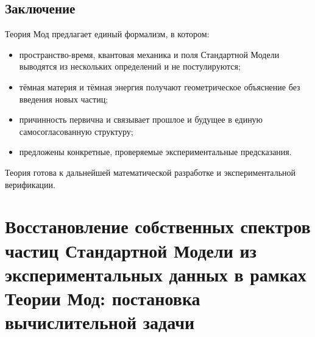 \documentclass[12pt,a4paper]{article}
\begin{document}
\subsection{Заключение}
Теория Мод предлагает единый формализм, в котором:
\begin{itemize}
    \item пространство-время, квантовая механика и поля Стандартной Модели выводятся из нескольких определений и не постулируются;
    \item тёмная материя и тёмная энергия получают геометрическое объяснение без введения новых частиц;
    \item причинность первична и связывает прошлое и будущее в единую самосогласованную структуру;
    \item предложены конкретные, проверяемые экспериментальные предсказания.
\end{itemize}

Теория готова к дальнейшей математической разработке и экспериментальной верификации.

\newpage
\section{Восстановление собственных спектров частиц Стандартной Модели из экспериментальных данных в рамках Теории Мод: постановка вычислительной задачи}

\begin{abstract}
В рамках Теории Мод ставится задача восстановления «собственных спектров» всех частиц Стандартной Модели. Собственный спектр частицы определяется как вектор в пространстве типов частиц, компоненты которого являются проекциями фундаментальной спектральной функции на направления других частиц. Задача формулируется как система алгебраических уравнений и ограничений, связывающих компоненты спектров с экспериментально измеренными величинами: константами связи, массами, спинами и калибровочными квантовыми числами. Показано, что система недоопределена (степеней свободы больше, чем уравнений), что отражает калибровочную свободу Теории Мод и указывает на необходимость дополнительных экспериментальных данных или теоретических принципов (например, принципа минимальной спектральной энтропии) для однозначного решения. Сформулирована оптимизационная задача, готовая для численного моделирования.

\bigskip
\noindent\textbf{Ключевые слова:} Теория Мод, собственный спектр, Стандартная Модель, обратная задача, калибровочная свобода, спектральная энтропия.
\end{abstract}
\end{document}
